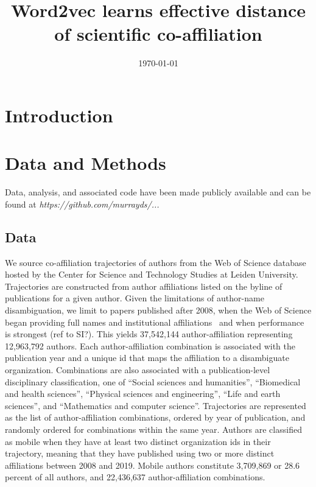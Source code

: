 \documentclass[12pt]{article} %
\begin{document}

\title{Word2vec learns effective distance of scientific co-affiliation} %
\date{\today}
\maketitle %

\section{Introduction}\label{sec:introduction} %



%
%
\section{Data and Methods}
\label{sec:datamethods} %

Data, analysis, and associated code have been made publicly available and can be found at \textit{https://github.com/murrayds/...}


\subsection*{Data}
We source co-affiliation trajectories of authors from the Web of Science database hosted by the Center for Science and Technology Studies at Leiden University. 
Trajectories are constructed from author affiliations listed on the byline of publications for a given author.
Given the limitations of author-name disambiguation, we limit to papers published after 2008, when the Web of Science began providing full names and institutional affiliations~\cite{caron2014disambiguation} and when performance is strongest (ref to SI?). 
This yields 37,542,144 author-affiliation representing 12,963,792 authors. 
Each author-affiliation combination is associated with the publication year and a unique id that maps the affiliation to a disambiguate organization. 
Combinations are also associated with a publication-level disciplinary classification, one of ``Social sciences and humanities'',
``Biomedical and health sciences'', ``Physical sciences and engineering'', ``Life and earth sciences'', and ``Mathematics and computer science''.
Trajectories are represented as the list of author-affiliation combinations, ordered by year of publication, and randomly ordered for combinations within the same year. 
Authors are classified as mobile when they have at least two distinct organization ids in their trajectory, meaning that they have published using two or more distinct affiliations between 2008 and 2019.
Mobile authors constitute 3,709,869 or 28.6 percent of all authors, and 22,436,637 author-affiliation combinations. 
\end{document}
